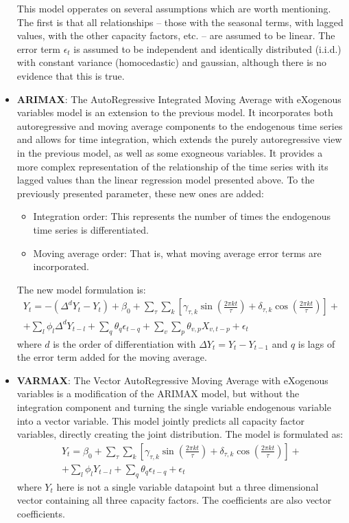 \begin{itemize}
    This model opperates on several assumptions which are worth mentioning. The first is that all relationships -- those with the seasonal terms, with lagged values, with the other capacity factors, etc. -- are assumed to be linear. The error term $\epsilon_t$ is assumed to be independent and identically distributed (i.i.d.) with constant variance (homocedastic) and gaussian, although there is no evidence that this is true. 
    \item \textbf{ARIMAX}: The AutoRegressive Integrated Moving Average with eXogenous variables model is an extension to the previous model. It incorporates both autoregressive and moving average components to the endogenous time series and allows for time  integration, which extends the purely autoregressive view in the previous model, as well as some exogneous variables. It provides a more complex representation of the relationship of the time series with its lagged values than the linear regression model presented above. To the previously presented parameter, these new ones are added:
    \begin{itemize}
        \item Integration order: This represents the number of times the endogenous time series is differentiated. 
        \item Moving average order: That is, what moving average error terms are incorporated.
    \end{itemize}  
    The new model formulation is:
    \begin{multline}
        Y_t=-\left(\Delta^d Y_t - Y_t\right) + \beta_0 + \sum_{\tau}\sum_{k}\left[\gamma_{\tau,k}\sin\left(\frac{2\pi k t}{\tau}\right) + \delta_{\tau,k}\cos\left(\frac{2\pi k t}{\tau}\right)\right] +\\+ \sum_l \phi_l \Delta^d Y_{t-l} + \sum_q \theta_q \epsilon_{t-q} + \sum_v\sum_p\theta_{v,p}X_{v,t-p} + \epsilon_t
    \end{multline}
    where $d$ is the order of differentiation with $\Delta Y_t = Y_t - Y_{t-1}$ and $q$ is lags of the error term added for the moving average.
    \item \textbf{VARMAX}: The Vector AutoRegressive Moving Average with eXogenous variables is a modification of the ARIMAX model, but without the integration component and turning the single variable endogenous variable into a vector variable. This model jointly predicts all capacity factor variables, directly creating the joint distribution. The model is formulated as:
    \begin{multline}
        Y_t= \beta_0 + \sum_{\tau}\sum_{k}\left[\gamma_{\tau,k}\sin\left(\frac{2\pi k t}{\tau}\right) + \delta_{\tau,k}\cos\left(\frac{2\pi k t}{\tau}\right)\right] +\\+ \sum_l \phi_l Y_{t-l} + \sum_q \theta_q \epsilon_{t-q} + \epsilon_t
    \end{multline}
    where $Y_t$ here is not a single variable datapoint but a three dimensional vector containing all three capacity factors. The coefficients are also vector coefficients.
\end{itemize}
